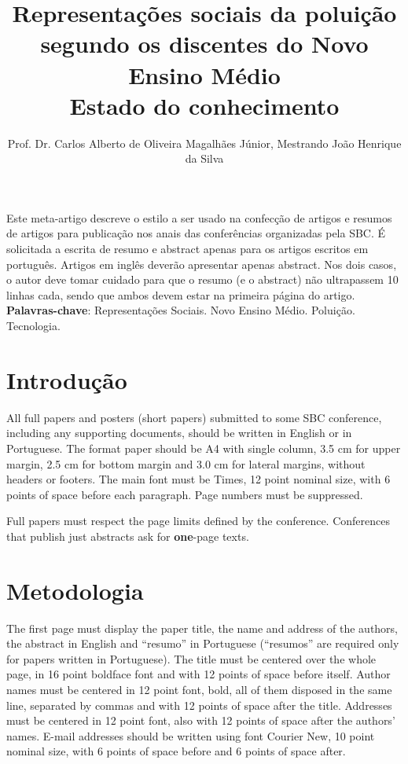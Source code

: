 \documentclass[12pt]{article}
\title{Representações sociais da poluição segundo os discentes do Novo Ensino Médio \\ Estado do conhecimento}
\author{Prof. Dr. Carlos Alberto de Oliveira Magalhães Júnior\inst{1}, Mestrando João Henrique da Silva\inst{1}}
\begin{document}
\maketitle

\begin{resumo} 
  Este meta-artigo descreve o estilo a ser usado na confecção de artigos e
  resumos de artigos para publicação nos anais das conferências organizadas
  pela SBC. É solicitada a escrita de resumo e abstract apenas para os artigos
  escritos em português. Artigos em inglês deverão apresentar apenas abstract.
  Nos dois casos, o autor deve tomar cuidado para que o resumo (e o abstract)
  não ultrapassem 10 linhas cada, sendo que ambos devem estar na primeira
  página do artigo.\\

  \textbf{Palavras-chave}: Representações Sociais. Novo Ensino Médio. Poluição. Tecnologia.
\end{resumo}


\section{Introdução}

All full papers and posters (short papers) submitted to some SBC conference,
including any supporting documents, should be written in English or in
Portuguese. The format paper should be A4 with single column, 3.5 cm for upper
margin, 2.5 cm for bottom margin and 3.0 cm for lateral margins, without
headers or footers. The main font must be Times, 12 point nominal size, with 6
points of space before each paragraph. Page numbers must be suppressed.

Full papers must respect the page limits defined by the conference.
Conferences that publish just abstracts ask for \textbf{one}-page texts.

\section{Metodologia}

The first page must display the paper title, the name and address of the
authors, the abstract in English and ``resumo'' in Portuguese (``resumos'' are
required only for papers written in Portuguese). The title must be centered
over the whole page, in 16 point boldface font and with 12 points of space
before itself. Author names must be centered in 12 point font, bold, all of
them disposed in the same line, separated by commas and with 12 points of
space after the title. Addresses must be centered in 12 point font, also with
12 points of space after the authors' names. E-mail addresses should be
written using font Courier New, 10 point nominal size, with 6 points of space
before and 6 points of space after.
\end{document}
